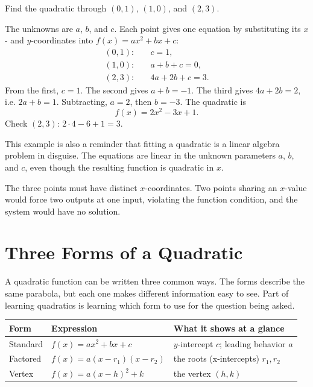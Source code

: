 \documentclass[12pt]{book}
\begin{document}
\begin{example}
Find the quadratic through $(0,1)$, $(1,0)$, and $(2,3)$.

The unknowns are $a$, $b$, and $c$. Each point gives one equation by substituting its
$x$- and $y$-coordinates into $f(x)=ax^2+bx+c$:
\[
\begin{aligned}
(0,1):&\quad c=1,\\
(1,0):&\quad a+b+c=0,\\
(2,3):&\quad 4a+2b+c=3.
\end{aligned}
\]
From the first, $c=1$. The second gives $a+b=-1$. The third gives $4a+2b=2$, i.e.
$2a+b=1$. Subtracting, $a=2$, then $b=-3$. The quadratic is
\[
f(x)=2x^2-3x+1.
\]
Check $(2,3)$: $2\cdot4-6+1=3$.
\end{example}

This example is also a reminder that fitting a quadratic is a linear algebra problem
in disguise. The equations are linear in the unknown parameters $a$, $b$, and $c$,
even though the resulting function is quadratic in $x$.

\begin{pitfall}
The three points must have distinct $x$-coordinates. Two points sharing an
$x$-value would force two outputs at one input, violating the function condition,
and the system would have no solution.
\end{pitfall}

\section{Three Forms of a Quadratic}

A quadratic function can be written three common ways. The forms describe the same
parabola, but each one makes different information easy to see. Part of learning
quadratics is learning which form to use for the question being asked.
\begin{center}
\renewcommand{\arraystretch}{1.6}
\begin{tabular}{@{}lll@{}}
\toprule
\textbf{Form} & \textbf{Expression} & \textbf{What it shows at a glance}\\
\midrule
Standard      & $f(x)=ax^2+bx+c$        & $y$-intercept $c$; leading behavior $a$\\
Factored      & $f(x)=a(x-r_1)(x-r_2)$  & the roots (x-intercepts) $r_1,r_2$\\
Vertex        & $f(x)=a(x-h)^2+k$       & the vertex $(h,k)$\\
\bottomrule
\end{tabular}
\end{center}
\end{document}
